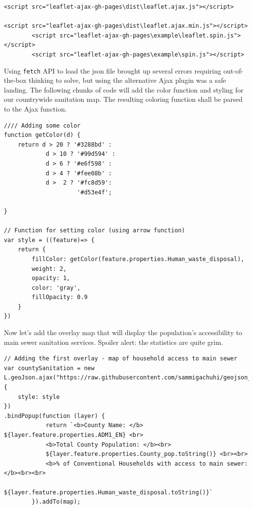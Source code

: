 \documentclass[
]{book}
\begin{document}
\begin{verbatim}
<script src="leaflet-ajax-gh-pages\dist\leaflet.ajax.js"></script>

<script src="leaflet-ajax-gh-pages\dist\leaflet.ajax.min.js"></script>
        <script src="leaflet-ajax-gh-pages\example\leaflet.spin.js"></script>
        <script src="leaflet-ajax-gh-pages\example\spin.js"></script> 
\end{verbatim}

Using \texttt{fetch} API to load the json file brought up several errors requiring out-of-the-box thinking to solve, but using the alternative Ajax plugin was a safe landing. The following chunks of code will add the color function and styling for our countrywide sanitation map. The resulting coloring function shall be parsed to the Ajax function.

\begin{verbatim}
//// Adding some color
function getColor(d) {
    return d > 20 ? '#3288bd' :
            d > 10 ? '#99d594' :
            d > 6 ? '#e6f598' :
            d > 4 ? '#fee08b' :
            d >  2 ? '#fc8d59':
                     '#d53e4f';
                       
}

// Function for setting color (using arrow function)
var style = ((feature)=> {
    return {
        fillColor: getColor(feature.properties.Human_waste_disposal),
        weight: 2,
        opacity: 1,
        color: 'gray',
        fillOpacity: 0.9
    }
})
\end{verbatim}

Now let's add the overlay map that will display the population's accessibility to main sewer sanitation services. Spoiler alert: the statistics are quite grim.

\begin{verbatim}
// Adding the first overlay - map of household access to main sewer
var countySanitation = new L.geoJson.ajax("https://raw.githubusercontent.com/sammigachuhi/geojson_files/main/counties_sanitation.json", {
    style: style
})
.bindPopup(function (layer) {
            return `<b>County Name: </b> ${layer.feature.properties.ADM1_EN} <br>
            <b>Total County Population: </b><br> 
            ${layer.feature.properties.County_pop.toString()} <br><br>
            <b>% of Conventional Households with access to main sewer: </b><br><br>
            ${layer.feature.properties.Human_waste_disposal.toString()}`
        }).addTo(map);
\end{verbatim}
\end{document}
